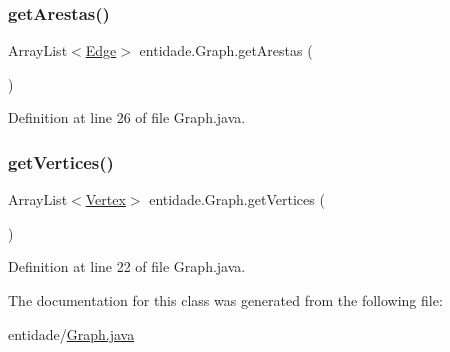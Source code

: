 \subsubsection{\texorpdfstring{get\+Arestas()}{getArestas()}}
{\footnotesize\ttfamily Array\+List$<$\hyperlink{classentidade_1_1Edge}{Edge}$>$ entidade.\+Graph.\+get\+Arestas (\begin{DoxyParamCaption}{ }\end{DoxyParamCaption})}



Definition at line 26 of file Graph.\+java.

\hypertarget{classentidade_1_1Graph_a680550908cc41c83b901fb795cbbfd47}{}\label{classentidade_1_1Graph_a680550908cc41c83b901fb795cbbfd47} 
\subsubsection{\texorpdfstring{get\+Vertices()}{getVertices()}}
{\footnotesize\ttfamily Array\+List$<$\hyperlink{classentidade_1_1Vertex}{Vertex}$>$ entidade.\+Graph.\+get\+Vertices (\begin{DoxyParamCaption}{ }\end{DoxyParamCaption})}



Definition at line 22 of file Graph.\+java.



The documentation for this class was generated from the following file\+:\begin{DoxyCompactItemize}
\item 
entidade/\hyperlink{Graph_8java}{Graph.\+java}\end{DoxyCompactItemize}

